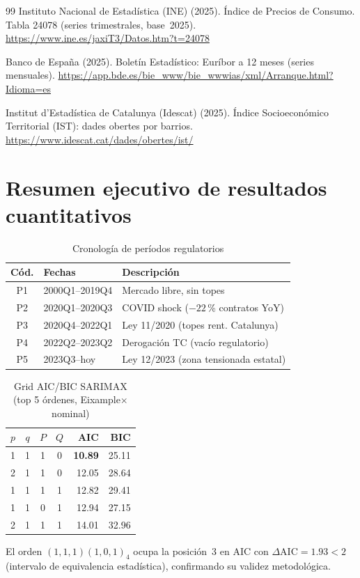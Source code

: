\documentclass[10pt,a4paper,twocolumn]{article}
\begin{document}
\begin{thebibliography}{99}
{Instituto Nacional de Estadística (INE)} (2025).
Índice de Precios de Consumo. Tabla 24078 (series trimestrales, base~2025).
\url{https://www.ine.es/jaxiT3/Datos.htm?t=24078}

{Banco de España} (2025).
Boletín Estadístico: Euríbor a 12 meses (series mensuales).
\url{https://app.bde.es/bie_www/bie_wwwias/xml/Arranque.html?Idioma=es}

{Institut d'Estadística de Catalunya (Idescat)} (2025).
Índice Socioeconómico Territorial (IST): dades obertes por barrios.
\url{https://www.idescat.cat/dades/obertes/ist/}

\end{thebibliography}

\appendix

\section{Resumen ejecutivo de resultados cuantitativos}
\label{app:resumen}

\begin{table}[H]
\caption{Cronología de períodos regulatorios}
\centering\small
\begin{tabular}{cll}
\toprule
Cód. & Fechas & Descripción \\
\midrule
P1 & 2000Q1--2019Q4 & Mercado libre, sin topes \\
P2 & 2020Q1--2020Q3 & COVID shock ($-22$\,\% contratos YoY) \\
P3 & 2020Q4--2022Q1 & Ley 11/2020 (topes rent. Catalunya) \\
P4 & 2022Q2--2023Q2 & Derogación TC (vacío regulatorio) \\
P5 & 2023Q3--hoy    & Ley 12/2023 (zona tensionada estatal) \\
\bottomrule
\end{tabular}
\end{table}

\begin{table}[H]
\caption{Grid AIC/BIC SARIMAX (top 5 órdenes, Eixample$\times$nominal)}
\centering\small
\begin{tabular}{ccccrr}
\toprule
$p$ & $q$ & $P$ & $Q$ & AIC & BIC \\
\midrule
1 & 1 & 1 & 0 & \textbf{10.89} & 25.11 \\
2 & 1 & 1 & 0 & 12.05 & 28.64 \\
1 & 1 & 1 & 1 & 12.82 & 29.41 \\
1 & 1 & 0 & 1 & 12.94 & 27.15 \\
2 & 1 & 1 & 1 & 14.01 & 32.96 \\
\bottomrule
\end{tabular}
\end{table}

\noindent El orden $(1,1,1)(1,0,1)_4$ ocupa la posición~3 en AIC con $\Delta\text{AIC}{=}1.93 < 2$
(intervalo de equivalencia estadística), confirmando su validez metodológica.
\end{document}
